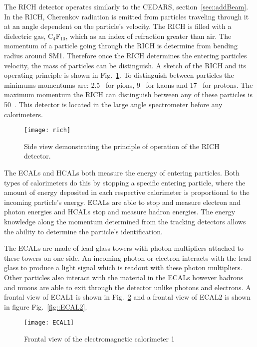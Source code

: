 The RICH detector operates similarly to the CEDARS, section~\ref{sec::addBeam}.
In the RICH, Cherenkov radiation is emitted from particles traveling through it
at an angle dependent on the particle's velocity.  The RICH is filled with a
dielectric gas, C$_4$F$_{10}$, which as an index of refraction greater than air.
The momentum of a particle going through the RICH is determine from bending
radius around SM1.  Therefore once the RICH determines the entering particles
velocity, the mass of particles can be distinguish.  A sketch of the RICH and
its operating principle is shown in Fig.~\ref{fig::rich}.  To distinguish
between particles the minimums momentums are: 2.5~{\gvc} for pions, 9~{\gvc} for
kaons and 17~{\gvc} for protons.  The maximum momentum the RICH can distinguish
between any of these particles is 50~{\gvc}. This detector is located in the
large angle spectrometer before any calorimeters.\par

\begin{figure}[h!t]
  \centering
  \texttt{[image: rich]}
  \caption{Side view demonstrating the principle of operation of the RICH
    detector.}
  \label{fig::rich}
\end{figure}

The ECALs and HCALs both measure the energy of entering particles.  Both types
of calorimeters do this by stopping a specific entering particle, where the
amount of energy deposited in each respective calorimeter is proportional to the
incoming particle's energy.  ECALs are able to stop and measure electron and
photon energies and HCALs stop and measure hadron energies.  The energy
knowledge along the momentum determined from the tracking detectors allows the
ability to determine the particle's identification. \par

The ECALs are made of lead glass towers with photon multipliers attached to
these towers on one side.  An incoming photon or electron interacts with the
lead glass to produce a light signal which is readout with these photon
multipliers.  Other particles also interact with the material in the ECALs
however hadrons and muons are able to exit through the detector unlike photons
and electrons.  A frontal view of ECAL1 is shown in Fig.~\ref{fig::ECAL1} and a
frontal view of ECAL2 is shown in figure Fig.~\ref{fig::ECAL2}. \par

\begin{figure}[h!t]
  \centering
  \texttt{[image: ECAL1]}
  \caption{Frontal view of the electromagnetic calorimeter 1}
  \label{fig::ECAL1}
\end{figure}

